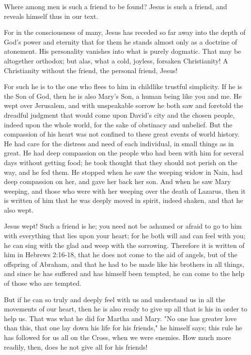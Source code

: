 Where among men is such a friend to be found? Jesus is such a friend, and reveals himself thus in our text.

For in the consciousness of many, Jesus has receded so far away into the depth of God’s power and eternity that for them he stands almost only as a doctrine of atonement. His personality vanishes into what is purely dogmatic. That may be altogether orthodox; but alas, what a cold, joyless, forsaken Christianity! A Christianity without the friend, the personal friend, Jesus!

For such he is to the one who flees to him in childlike trustful simplicity. If he is the Son of God, then he is also Mary’s Son, a human being like you and me. He wept over Jerusalem, and with unspeakable sorrow he both saw and foretold the dreadful judgment that would come upon David’s city and the chosen people, indeed upon the whole world, for the sake of obstinacy and unbelief. But the compassion of his heart was not confined to these great events of world history. He had care for the distress and need of each individual, in small things as in great. He had deep compassion on the people who had been with him for several days without getting food; he took thought that they should not perish on the way, and he fed them. He stopped when he saw the weeping widow in Nain, had deep compassion on her, and gave her back her son. And when he saw Mary weeping, and those who were with her weeping over the death of Lazarus, then it is written of him that he was deeply moved in spirit, indeed shaken, and that he also wept.

Jesus wept! Such a friend is he; you need not be ashamed or afraid to go to him with everything that lies upon your heart; for he both will and can feel with you; he can sing with the glad and weep with the sorrowing. Therefore it is written of him in Hebrews 2:16-18, that he does not come to the aid of angels, but of the offspring of Abraham, and that he had to be made like his brothers in all things, and since he has suffered and has himself been tempted, he can come to the help of those who are tempted.

But if he can so truly and deeply feel with us and understand us in all the movements of our heart, then he is also ready to give up all that is his in order to help us. That was what he did for Martha and Mary. "No one has greater love than this, that one lay down his life for his friends," he himself says; this rule he has followed for us all on the Cross, when we were enemies. How much more readily, then, does he not give all for his friends!

